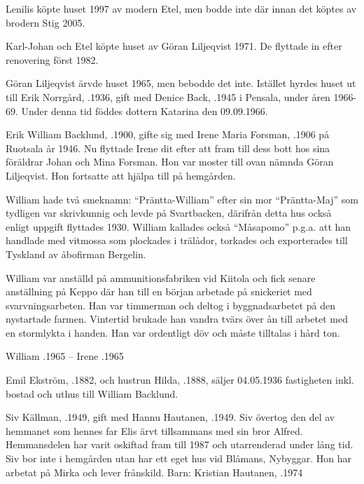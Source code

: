 Lenilis köpte huset 1997 av modern Etel, men bodde inte där innan det köptes av brodern Stig 2005.


Karl-Johan och Etel köpte huset av Göran Liljeqvist 1971. De flyttade in efter renovering först 1982.


Göran Liljeqvist ärvde huset 1965, men bebodde det inte. Istället hyrdes huset ut till Erik Norrgård, .1936, gift med Denice Back, .1945 i Pensala, under åren 1966-69. Under denna tid föddes dottern Katarina den 09.09.1966.


Erik William Backlund, .1900, gifte sig med Irene Maria Forsman, .1906 på Ruotsala år 1946. Nu flyttade Irene dit efter att fram till dess bott hos sina föräldrar Johan och Mina Forsman. Hon var moster till ovan nämnda Göran Liljeqvist. Hon fortsatte att hjälpa till på hemgården.

William hade två smeknamn: ``Präntta-William'' efter sin mor ``Präntta-Maj'' som tydligen var skrivkunnig och levde på Svartbacken, därifrån detta hus också enligt uppgift flyttades 1930. William kallades också ``Måsapomo'' p.g.a. att han handlade med vitmossa som plockades i trälådor, torkades och exporterades till Tyskland av åbofirman Bergelin.

William var anställd på ammunitionsfabriken vid Kiitola och fick senare anställning på Keppo där han till en början arbetade på snickeriet med svarvningsarbeten. Han var timmerman och deltog i byggnadsarbetet på den nystartade farmen. Vintertid brukade han vandra tvärs över ån till arbetet med en stormlykta i handen. Han var ordentligt döv och måste tilltalas i hård ton.

William .1965  --  Irene .1965


Emil Ekström, .1882, och hustrun Hilda, .1888, säljer 04.05.1936 fastigheten inkl. bostad och uthus till William Backlund.




Siv Källman, .1949, gift med Hannu Hautanen, .1949. Siv övertog den del av hemmanet som hennes far Elis ärvt tillsammans med sin bror Alfred. Hemmansdelen har varit oskiftad fram till 1987 och utarrenderad under lång tid. Siv bor inte i hemgården utan har ett eget hus vid Blåmans, Nybyggar. Hon har arbetat på Mirka och lever frånskild.
Barn: Kristian Hautanen, .1974


